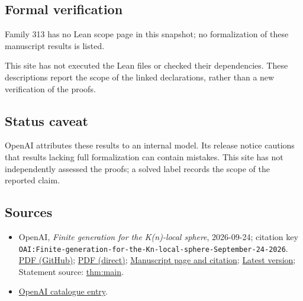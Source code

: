 \documentclass[11pt]{article}
\begin{document}
\subsection{Formal verification}
Family 313 has no Lean scope page in this snapshot; no formalization of these manuscript results is listed.

This site has not executed the Lean files or checked their dependencies. These descriptions report the scope of the linked declarations, rather than a new verification of the proofs.

\subsection{Status caveat}
OpenAI attributes these results to an internal model. Its release notice cautions that results lacking full formalization can contain mistakes. This site has not independently assessed the proofs; a solved label records the scope of the reported claim.

\subsection{Sources}
\begin{itemize}
\item OpenAI, \emph{Finite generation for the K(n)-local sphere}, 2026-09-24; citation key \texttt{OAI:Finite-generation-for-the-Kn-local-sphere-September-24-2026}. \href{https://github.com/openai/math/blob/adc7f1241b42e322a6451854ab7e4b4c146bf78a/preprints/Finite-generation-for-the-Kn-local-sphere-September-24-2026/Finite-generation-for-the-Kn-local-sphere-September-24-2026.pdf}{PDF (GitHub)}; \href{https://github.com/openai/math/raw/adc7f1241b42e322a6451854ab7e4b4c146bf78a/preprints/Finite-generation-for-the-Kn-local-sphere-September-24-2026/Finite-generation-for-the-Kn-local-sphere-September-24-2026.pdf}{PDF (direct)}; \href{https://github.com/openai/math/blob/adc7f1241b42e322a6451854ab7e4b4c146bf78a/preprints/Finite-generation-for-the-Kn-local-sphere-September-24-2026/README.md}{Manuscript page and citation}; \href{https://github.com/openai/math/blob/main/preprints/Finite-generation-for-the-Kn-local-sphere-September-24-2026/Finite-generation-for-the-Kn-local-sphere-September-24-2026.pdf}{Latest version}; Statement source: \href{https://github.com/openai/math/blob/adc7f1241b42e322a6451854ab7e4b4c146bf78a/preprints/Finite-generation-for-the-Kn-local-sphere-September-24-2026/build/sections/01-introduction.tex\#L13}{thm:main}.
\item \href{https://github.com/openai/math/blob/adc7f1241b42e322a6451854ab7e4b4c146bf78a/CONTENTS.md}{OpenAI catalogue entry}.
\end{itemize}
\end{document}
